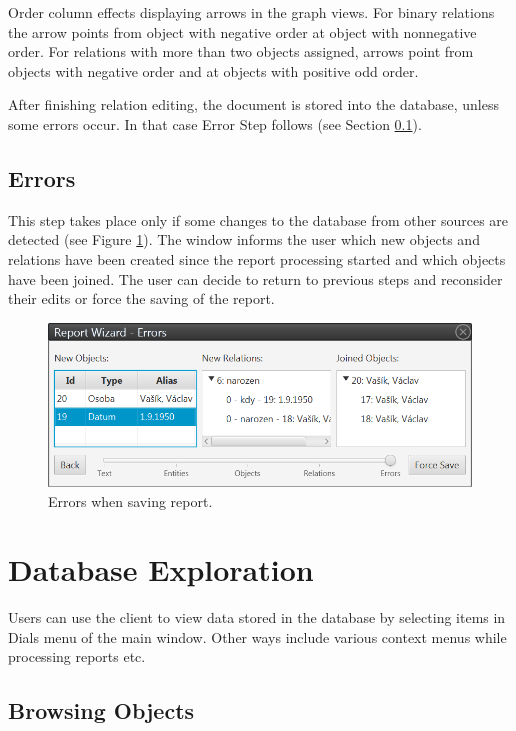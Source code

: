 Order column effects displaying arrows in the graph views. For binary
relations the arrow points from object with negative order at object with
nonnegative order. For relations with more than two objects assigned, arrows
point from objects with negative order and at objects with positive odd order.

After finishing relation editing, the document is stored into the database,
unless some errors occur. In that case Error Step follows (see Section
\ref{sssec:Errors}).

\subsection{Errors}
\label{sssec:Errors}

This step takes place only if some changes to the database from other sources
are detected (see Figure \ref{fig:Errors}). The window informs the user which
new objects and relations have been created since the report processing started
and which objects have been joined. The user can decide to return to previous steps and reconsider their edits or force the saving of the report.

\begin{figure}[!htb]
        \centering
        \includegraphics[width=\textwidth]{Images/errors}
        \caption{Errors when saving report.}
        \label{fig:Errors}
\end{figure}

\section{Database Exploration}
\label{ssec:ViewDatabase}

Users can use the client to view data stored in the database by selecting items
in Dials menu of the main window. Other ways include various context menus
while processing reports etc.

\subsection{Browsing Objects}
\label{sssec:ObjectList}

